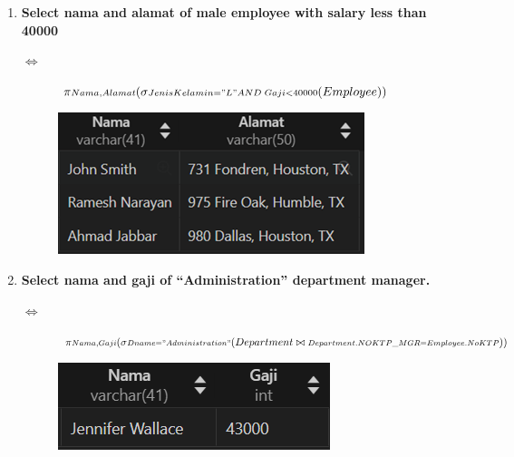 \documentclass{extarticle}
\begin{document}
\begin{enumerate}
    \item {\textbf{Select nama and alamat of male employee with salary less than 40000}}
    \begin{description} 
        \item[$\Leftrightarrow$] {\large $\pi {\scriptstyle Nama,Alamat}(\sigma{\scriptstyle JenisKelamin = "L" AND \; Gaji < 40000}(Employee))$}    
        \item[] \includegraphics[scale=0.7]{9.png}
    \end{description}
    
        \pagebreak

\item {\textbf{Select nama and gaji of “Administration” department
manager.}}
\begin{description} 
    \item[$\Leftrightarrow$] {\large $\pi {\scriptstyle Nama,Gaji}(\sigma{\scriptstyle Dname = "Administration"}(Department \bowtie \\ {\scriptstyle Department.NOKTP\_MGR = Employee.NoKTP}))$}    
    \item[] \includegraphics[scale=0.7]{10.png}
    \end{description}
\end{enumerate}
\end{document}
